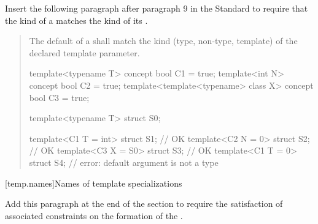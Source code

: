 Insert the following paragraph after paragraph 9 in the \Cpp Standard to 
require that the kind of a  matches the kind 
of its .

\begin{quote}
\begin{addedblock}
\setcounter{Paras}{11}
\pnum
The default  of
a  shall match
the kind (type, non-type, template) of the declared template parameter.
% 
\enterexample
\begin{codeblock}
template<typename T> concept bool C1 = true;
template<int N> concept bool C2 = true;
template<template<typename> class X> concept bool C3 = true;

template<typename T> struct S0;

template<C1 T = int> struct S1; // OK
template<C2 N = 0> struct S2;   // OK
template<C3 X = S0> struct S3;  // OK
template<C1 T = 0> struct S4;   // error: default argument is not a type
\end{codeblock}
\exitexample
\end{addedblock}
\end{quote}


[temp.names]{Names of template specializations}

Add this paragraph at the end of the section to require the satisfaction of 
associated constraints on the formation of the .

